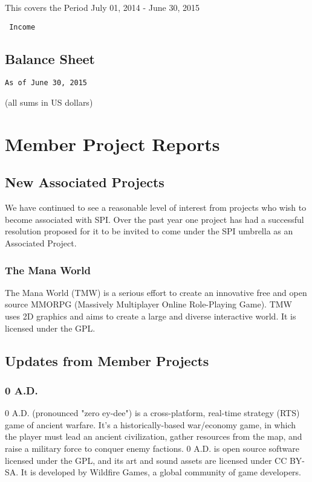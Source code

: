 \documentclass[letterpaper]{report}
\begin{document}
This covers the Period July 01, 2014 - June 30, 2015

\begin{verbatim}
 Income
\end{verbatim}

\section{Balance Sheet}

\begin{verbatim}
As of June 30, 2015
\end{verbatim}

(all sums in US dollars)


\chapter{Member Project Reports}

\section{New Associated Projects}

We have continued to see a reasonable level of interest from projects who wish
to become associated with SPI.  Over the past year one project has had
a successful resolution proposed for it to be invited to come under the SPI
umbrella as an Associated Project.


\subsection{The Mana World}

The Mana World (TMW) is a serious effort to create an innovative free and
open source MMORPG (Massively Multiplayer Online Role-Playing Game).  TMW
uses 2D graphics and aims to create a large and diverse interactive world.
It is licensed under the GPL.

\section{Updates from Member Projects}

\subsection{0 A.D.}

0 A.D. (pronounced "zero ey-dee") is a cross-platform, real-time strategy
(RTS) game of ancient warfare. It's a historically-based war/economy game,
in which the player must lead an ancient civilization, gather resources
from the map, and raise a military force to conquer enemy factions. 0 A.D.
is open source software licensed under the GPL, and its art and sound
assets are licensed under CC BY-SA. It is developed by Wildfire Games, a
global community of game developers.
\end{document}
